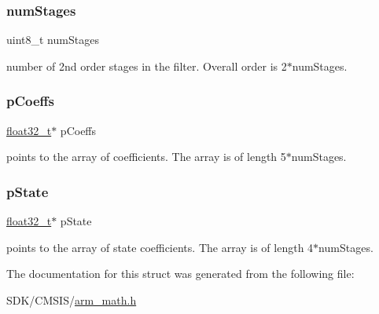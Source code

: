\subsubsection{\texorpdfstring{num\+Stages}{numStages}}
{\footnotesize\ttfamily uint8\+\_\+t num\+Stages}

number of 2nd order stages in the filter. Overall order is 2$\ast$num\+Stages. \mbox{\label{structarm__biquad__cascade__stereo__df2_t__instance__f32_aacbb8dd8eeba4b21fc2bb40076405ee3}} 
\subsubsection{\texorpdfstring{p\+Coeffs}{pCoeffs}}
{\footnotesize\ttfamily \mbox{\hyperlink{arm__math_8h_a4611b605e45ab401f02cab15c5e38715}{float32\+\_\+t}}$\ast$ p\+Coeffs}

points to the array of coefficients. The array is of length 5$\ast$num\+Stages. \mbox{\label{structarm__biquad__cascade__stereo__df2_t__instance__f32_a335c87e6fdc4b96601d95a5de8b9c463}} 
\subsubsection{\texorpdfstring{p\+State}{pState}}
{\footnotesize\ttfamily \mbox{\hyperlink{arm__math_8h_a4611b605e45ab401f02cab15c5e38715}{float32\+\_\+t}}$\ast$ p\+State}

points to the array of state coefficients. The array is of length 4$\ast$num\+Stages. 

The documentation for this struct was generated from the following file\+:\begin{DoxyCompactItemize}
\item 
S\+D\+K/\+C\+M\+S\+I\+S/\mbox{\hyperlink{arm__math_8h}{arm\+\_\+math.\+h}}\end{DoxyCompactItemize}
